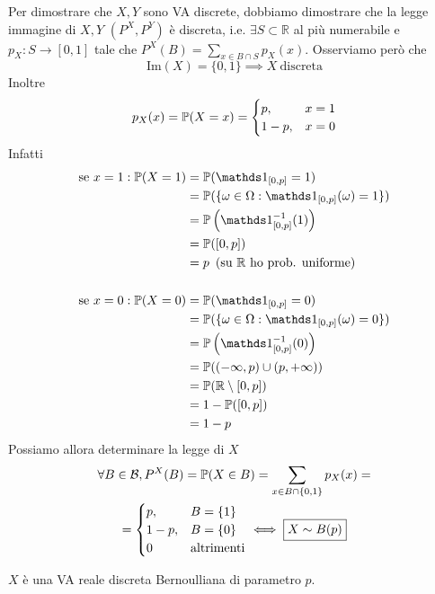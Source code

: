 \begin{enumerate}
Per dimostrare che $X,Y$ sono VA discrete, dobbiamo dimostrare che la legge immagine di $X,Y$ $\left( P^{X} ,P^{Y}\right)$ è discreta, i.e. $\exists S\subset \mathbb{R}$ al più numerabile e $p_{X} :S\rightarrow [ 0,1]$ tale che $P^{X}( B) =\sum\limits _{x\in B\cap S} p_{X}( x)$. Osserviamo però che
\begin{equation*}
\mathrm{Im}( X) =\{0,1\} \implies X\ \text{discreta}
\end{equation*}
Inoltre
\begin{equation*}
p_{X}( x) =\mathbb{P}( X=x) =
\begin{cases}
p, & x=1\\
1-p, & x=0
\end{cases}
\end{equation*}
Infatti
\begin{align*}
\text{se} \ x=1:\PP( X=1) & =\PP(\Ind_{[ 0,p]} =1)\\
 & =\PP(\{\omega \in \Omega :\Ind_{[ 0,p]}( \omega ) =1\})\\
 & =\PP\left(\Ind_{[ 0,p]}^{-1}( 1)\right)\\
 & =\PP([ 0,p])\\
 & =p\ \left(\text{su} \ \mathbb{R} \ \text{ho prob. uniforme}\right)\\
 & \\
\text{se} \ x=0:\PP( X=0) & =\PP(\Ind_{[ 0,p]} =0)\\
 & =\PP(\{\omega \in \Omega :\Ind_{[ 0,p]}( \omega ) =0\})\\
 & =\PP\left(\Ind_{[ 0,p]}^{-1}( 0)\right)\\
 & =\PP(( -\infty ,p) \cup ( p,+\infty ))\\
 & =\PP(\mathbb{R} \setminus [ 0,p])\\
 & =1-\PP([ 0,p])\\
 & =1-p
\end{align*}
Possiamo allora determinare la legge di $X$
\begin{gather*}
\forall B\in \mathcal{B} ,P^{X}( B) =\mathbb{P}( X\in B) =\sum\limits _{x\in B\cap \{0,1\}} p_{X}( x) =\\
=
\begin{cases}
p, & B=\{1\}\\
1-p, & B=\{0\}\\
0 & \text{altrimenti}
\end{cases}
\iff \boxed{X\sim B( p)}
\end{gather*}

$X$ è una VA reale discreta Bernoulliana di parametro $p$.


\end{enumerate}
